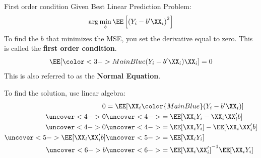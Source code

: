 \documentclass[compress, 8pt]{beamer}
\begin{document}
\begin{frame}{First order condition}
    Given Best Linear Prediction Problem:
    \begin{equation*}
        \arg \min_{b} \EE \left[ \left(Y_i - b^\prime \XX_i \right)^2 \right]
    \end{equation*}
    To find the $b$ that minimizes the MSE, you set the derivative equal to zero. This is called the \textbf{first order condition}.
\begin{equation*}
    \EE [{\color<3->{MainBlue}(Y_i - b^\prime \XX_i)} \XX_i] = 0
\end{equation*}
This is also referred to as the \textbf{Normal Equation}.

\vspace{2ex}
To find the solution, use linear algebra:
\begin{align*}
    0 &= \EE[\XX_i {\color{MainBlue}(Y_i - b^\prime \XX_i)}] \\
    \uncover<4->{0} &\uncover<4->{= \EE [\XX_i Y_i - \XX_i \XX_i^\prime b]} \\
    \uncover<4->{0} &\uncover<4->{= \EE [\XX_i Y_i] - \EE [\XX_i \XX_i^\prime b]}\\
    \uncover<5->{\EE [\XX_i \XX_i^\prime b]} &\uncover<5->{= \EE [\XX_i Y_i]} \\
    \uncover<6->{b} &\uncover<6->{= \EE [\XX_i \XX_i^\prime]^{-1} \EE [\XX_i Y_i]}
\end{align*}

\end{frame}
\end{document}
